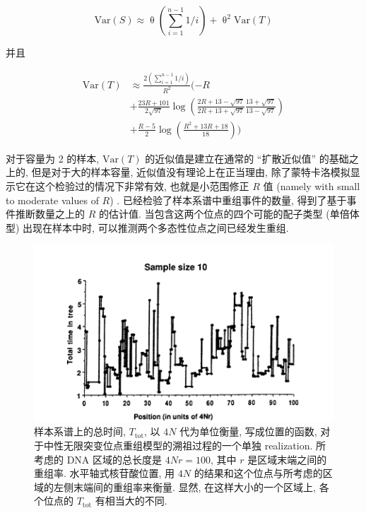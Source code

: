 \documentclass[12pt]{article}
\begin{document}
\begin{equation} \label{eq:14}
    \text{Var}(S) \approx \uptheta \left(\overset{n-1}{\underset{i=1}\sum }1/i \right) + \uptheta ^{2}\text{Var}(T)
\end{equation}

并且

\begin{equation} \label{eq:15}
    \begin{split}
        \text{Var}(T) & \approx \frac{2 \left(\sum_{i=1}^{n-1} 1/i \right)}{R^{2}}(-R \\
        & + \frac{23R+101}{2\sqrt{97}} \log \left(\frac{2R+13-\sqrt{97}}{2R+13+\sqrt{97}} \frac{13+\sqrt{97}}{13-\sqrt{97}} \right) \\
        & + \frac{R-5}{2}\log \left(\frac{R^{2}+13R+18}{18} \right))
    \end{split}
\end{equation}

对于容量为 2 的样本, $\text{Var}(T)$ 的近似值是建立在通常的 ``扩散近似值'' 的基础之上的, 但是对于大的样本容量,
近似值没有理论上在正当理由, 除了蒙特卡洛模拟显示它在这个检验过的情况下非常有效, 也就是小范围修正 $R$ 值 (namely with
small to moderate values of $R$) \parencite{kaplan1985}. \textcite{kaplan1985}
已经检验了样本系谱中重组事件的数量, 得到了基于事件推断数量之上的 $R$ 的估计值. 当包含这两个位点的四个可能的配子类型
(单倍体型) 出现在样本中时, 可以推测两个多态性位点之间已经发生重组.

\begin{figure}
    \centering
    \includegraphics{coalescent-process.images/image5.png}
    \caption{
        样本系谱上的总时间, $T_{\text{tot}}$, 以 $4N$ 代为单位衡量, 写成位置的函数,
        对于中性无限突变位点重组模型的溯祖过程的一个单独 realization.
        所考虑的 DNA 区域的总长度是 $4Nr=100$, 其中 $r$ 是区域末端之间的重组率.
        水平轴式核苷酸位置, 用 $4N$ 的结果和这个位点与所考虑的区域的左侧末端间的重组率来衡量.
        显然, 在这样大小的一个区域上, 各个位点的 $T_{\text{tot}}$ 有相当大的不同.
    }
    \label{fig:5}
\end{figure}
\end{document}
